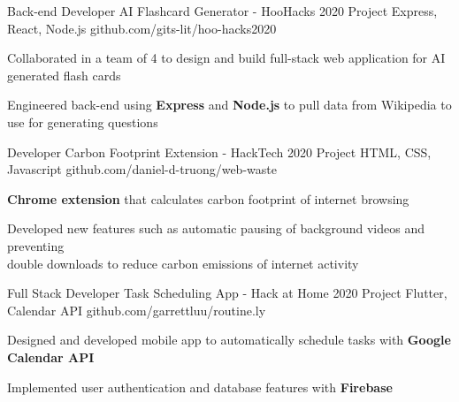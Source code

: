 \documentclass[]{awesome-cv}
\begin{document}
\vspace{-5mm}
\begin{cventries}

	\cventry
  {Back-end Developer}
  {AI Flashcard Generator - HooHacks 2020 Project}
	{Express, React, Node.js}
	{github.com/gits-lit/hoo-hacks2020}
  {\begin{cvitems}
    \item{Collaborated in a team of 4 to design and build full-stack web
      application for AI generated flash cards}
    \item{Engineered back-end using \textbf{Express} and \textbf{Node.js} to
      pull data from Wikipedia to use for generating questions}
    \end{cvitems}}

  \vspace{-3mm}
	\cventry
  {Developer}
  {Carbon Footprint Extension - HackTech 2020 Project}
  {HTML, CSS, Javascript}
	{github.com/daniel-d-truong/web-waste}
  {\begin{cvitems}
    \item{\textbf{Chrome extension} that calculates carbon footprint of
      internet browsing}
    \item{Developed new features such as automatic pausing of background
      videos and preventing \\ double downloads to reduce carbon emissions of
      internet activity}
    \end{cvitems}}

  \vspace{-3mm}
	\cventry
  {Full Stack Developer}
	{Task Scheduling App - Hack at Home 2020 Project}
	{Flutter, Calendar API}
	{github.com/garrettluu/routine.ly}
  {\begin{cvitems}
    \item{Designed and developed mobile app to automatically schedule tasks with
      \textbf{Google Calendar API}}
    \item{Implemented user authentication and database features with
      \textbf{Firebase}}
  \end{cvitems}}

\end{cventries}

\end{document}
